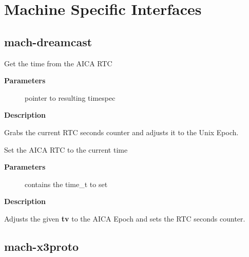 \documentclass[a4paper,8pt,english]{sphinxmanual}
\begin{document}
\chapter{Machine Specific Interfaces}
\label{sh/index:machine-specific-interfaces}

\section{mach-dreamcast}
\label{sh/index:mach-dreamcast}

\begin{fulllineitems}
\label{sh/index:c.aica_rtc_gettimeofday}
Get the time from the AICA RTC

\end{fulllineitems}


\textbf{Parameters}
\begin{description}
\item[{}] \leavevmode
pointer to resulting timespec

\end{description}

\textbf{Description}

Grabs the current RTC seconds counter and adjusts it to the Unix Epoch.

\begin{fulllineitems}
\label{sh/index:c.aica_rtc_settimeofday}
Set the AICA RTC to the current time

\end{fulllineitems}


\textbf{Parameters}
\begin{description}
\item[{}] \leavevmode
contains the time\_t to set

\end{description}

\textbf{Description}

Adjusts the given \textbf{tv} to the AICA Epoch and sets the RTC seconds counter.


\section{mach-x3proto}
\label{sh/index:mach-x3proto}
\end{document}
